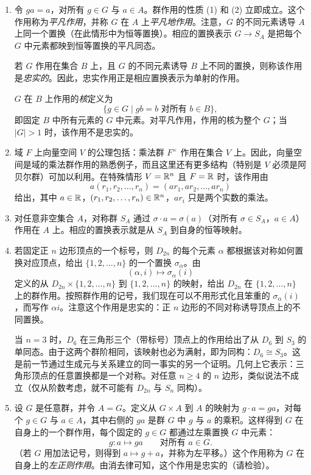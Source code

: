 \begin{enumerate}[label=(\arabic*)]
  \item 令 $ga=a$，对所有 $g\in G$ 与 $a\in A$。群作用的性质 (1) 和 (2) 立即成立。这个作用称为\emph{平凡作用}，并称 $G$ 在 $A$ 上\emph{平凡地作用}。注意，$G$ 的不同元素诱导 $A$ 上同一个置换（在此情形中为恒等置换）。相应的置换表示 $G\to S_A$ 是把每个 $G$ 中元素都映到恒等置换的平凡同态。

  若 $G$ 作用在集合 $B$ 上，且 $G$ 的不同元素诱导 $B$ 上不同的置换，则称该作用是\emph{忠实的}。因此，忠实作用正是相应置换表示为单射的作用。

  $G$ 在 $B$ 上作用的\emph{核}定义为
  \[
    \{g\in G\mid gb=b\text{ 对所有 }b\in B\},
  \]
  即固定 $B$ 中所有元素的 $G$ 中元素。对平凡作用，作用的核为整个 $G$；当 $|G|>1$ 时，该作用不是忠实的。

  \item 域 $F$ 上向量空间 $V$ 的公理包括：乘法群 $F^\times$ 作用在集合 $V$ 上。因此，向量空间是域的乘法群作用的熟悉例子，而且这里还有更多结构（特别是 $V$ 必须是阿贝尔群）可加以利用。在特殊情形 $V=\mathbb{R}^n$ 且 $F=\mathbb{R}$ 时，该作用由
  \[
    a(r_1,r_2,\ldots,r_n)=(ar_1,ar_2,\ldots,ar_n)
  \]
  给出，其中 $a\in\mathbb{R}$，$(r_1,r_2,\ldots,r_n)\in\mathbb{R}^n$，$ar_i$ 只是两个实数的乘法。

  \item 对任意非空集合 $A$，对称群 $S_A$ 通过 $\sigma\cdot a=\sigma(a)$（对所有 $\sigma\in S_A$，$a\in A$）作用在 $A$ 上。相应的置换表示就是从 $S_A$ 到自身的恒等映射。

  \item 若固定正 $n$ 边形顶点的一个标号，则 $D_{2n}$ 的每个元素 $\alpha$ 都根据该对称如何置换对应顶点，给出 $\{1,2,\ldots,n\}$ 的一个置换 $\sigma_\alpha$。由
  \[
    (\alpha,i)\mapsto \sigma_\alpha(i)
  \]
  定义的从 $D_{2n}\times\{1,2,\ldots,n\}$ 到 $\{1,2,\ldots,n\}$ 的映射，给出 $D_{2n}$ 在 $\{1,2,\ldots,n\}$ 上的群作用。按照群作用的记号，我们现在可以不用形式化且笨重的 $\sigma_\alpha(i)$，而写作 $\alpha i$。注意这个作用是忠实的：正 $n$ 边形的不同对称诱导顶点上的不同置换。

  当 $n=3$ 时，$D_6$ 在三角形三个（带标号）顶点上的作用给出了从 $D_6$ 到 $S_3$ 的单同态。由于这两个群阶相同，该映射也必为满射，即为同构：$D_6\cong S_3$。这是前一节通过生成元与关系建立的同一事实的另一个证明。几何上它表示：三角形顶点的任意置换都是一个对称。对任意 $n\geq4$ 的 $n$ 边形，类似说法不成立（仅从阶数考虑，就不可能有 $D_{2n}$ 与 $S_n$ 同构）。

  \item 设 $G$ 是任意群，并令 $A=G$。定义从 $G\times A$ 到 $A$ 的映射为 $g\cdot a=ga$，对每个 $g\in G$ 与 $a\in A$，其中右侧的 $ga$ 是群 $G$ 中 $g$ 与 $a$ 的乘积。这样得到 $G$ 在自身上的一个群作用，每个固定的 $g\in G$ 都通过左乘置换 $G$ 中元素：
  \[
    g:a\mapsto ga\qquad\text{对所有 }a\in G.
  \]
  （若 $G$ 用加法记号，则得到 $a\mapsto g+a$，并称为左平移。）这个作用称为 $G$ 在自身上的\emph{左正则作用}。由消去律可知，这个作用是忠实的（请检验）。
\end{enumerate}

